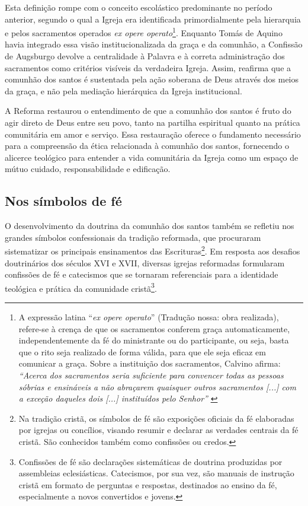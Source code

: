 Esta definição rompe com o conceito escolástico predominante no período anterior, segundo o qual a Igreja era identificada primordialmente pela hierarquia e pelos sacramentos operados \textit{\foreignlanguage{latin}{ex opere operato}}\footnote{A expressão latina ``\textit{\foreignlanguage{latin}{ex opere operato}}'' (Tradução nossa: obra realizada), refere-se à crença de que os sacramentos conferem graça automaticamente, independentemente da fé do ministrante ou do participante, ou seja, basta que o rito seja realizado de forma válida, para que ele seja eficaz em comunicar a graça. Sobre a instituição dos sacramentos, Calvino afirma: \textit{``Acerca dos sacramentos seria suficiente para convencer todas as pessoas sóbrias e ensináveis a não abraçarem quaisquer outros sacramentos [...] com a exceção daqueles dois [...] instituídos pelo Senhor''} \cite[v.~4, Capítulo~XIX, p.~2605]{calvino2022}}. Enquanto Tomás de Aquino havia integrado essa visão institucionalizada da graça e da comunhão, a Confissão de Augsburgo devolve a centralidade à Palavra e à correta administração dos sacramentos como critérios visíveis da verdadeira Igreja. Assim, reafirma que a comunhão dos santos é sustentada pela ação soberana de Deus através dos meios da graça, e não pela mediação hierárquica da Igreja institucional.

A Reforma restaurou o entendimento de que a comunhão dos santos é fruto do agir direto de Deus entre seu povo, tanto na partilha espiritual quanto na prática comunitária em amor e serviço. Essa restauração oferece o fundamento necessário para a compreensão da ética relacionada à comunhão dos santos, fornecendo o alicerce teológico para entender a vida comunitária da Igreja como um espaço de mútuo cuidado, responsabilidade e edificação.

\subsection{Nos símbolos de fé}

O desenvolvimento da doutrina da comunhão dos santos também se refletiu nos grandes símbolos confessionais da tradição reformada, que procuraram sistematizar os principais ensinamentos das Escrituras\footnote{Na tradição cristã, os símbolos de fé são exposições oficiais da fé elaboradas por igrejas ou concílios, visando resumir e declarar as verdades centrais da fé cristã. São conhecidos também como confissões ou credos.}. Em resposta aos desafios doutrinários dos séculos XVI e XVII, diversas igrejas reformadas formularam confissões de fé e catecismos que se tornaram referenciais para a identidade teológica e prática da comunidade cristã\footnote{Confissões de fé são declarações sistemáticas de doutrina produzidas por assembleias eclesiásticas. Catecismos, por sua vez, são manuais de instrução cristã em formato de perguntas e respostas, destinados ao ensino da fé, especialmente a novos convertidos e jovens.}.


